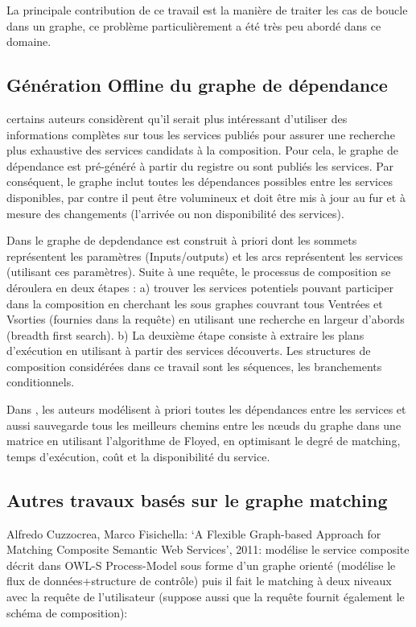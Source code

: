   La principale contribution de ce travail est la manière de traiter
  les cas de boucle dans un graphe, ce problème particulièrement a été
  très peu abordé dans ce domaine.

  \subsection{Génération Offline du graphe de dépendance}
  \label{sec:gener-offline}
  certains auteurs considèrent qu'il serait plus intéressant
  d'utiliser des informations complètes sur tous les services publiés
  pour assurer une recherche plus exhaustive des services candidats à
  la composition. Pour cela, le graphe de dépendance est pré-généré à
  partir du registre ou sont publiés les services. Par conséquent, le
  graphe inclut toutes les dépendances possibles entre les services
  disponibles, par contre il peut être volumineux et doit être mis à
  jour au fur et à mesure des changements (l'arrivée ou non
  disponibilité des services).

  Dans \cite{hashemian2006graph} le graphe de depdendance est
  construit à priori dont les sommets représentent les paramètres
  (Inputs/outputs) et les arcs représentent les services (utilisant
  ces paramètres). Suite à une requête, le processus de composition se
  déroulera en deux étapes : a) trouver les services potentiels
  pouvant participer dans la composition en cherchant les sous graphes
  couvrant tous Ventrées et Vsorties (fournies dans la requête) en
  utilisant une recherche en largeur d'abords (breadth first
  search). b) La deuxième étape consiste à extraire les plans
  d'exécution en utilisant à partir des services découverts. Les
  structures de composition considérées dans ce travail sont les
  séquences, les branchements conditionnels.

  Dans \cite{elmaghraoui2011graph}, les auteurs modélisent à priori
  toutes les dépendances entre les services et aussi sauvegarde tous
  les meilleurs chemins entre les nœuds du graphe dans une matrice en
  utilisant l'algorithme de Floyed, en optimisant le degré de
  matching, temps d'exécution, coût et la disponibilité du service.

  \subsection{Autres travaux basés sur le graphe matching}
  \label{sec:autres-travaux}
  Alfredo Cuzzocrea, Marco Fisichella: ‘A Flexible Graph-based
  Approach for Matching Composite Semantic Web Services’, 2011:
  modélise le service composite décrit dans OWL-S Process-Model sous
  forme d’un graphe orienté (modélise le flux de données+structure de
  contrôle) puis il fait le matching à deux niveaux avec la requête de
  l’utilisateur (suppose aussi que la requête fournit également le
  schéma de composition):

